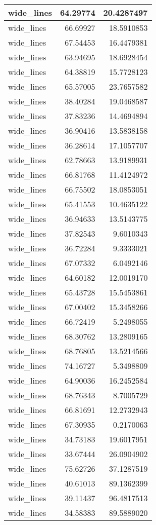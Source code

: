\documentclass[
]{book}
\theoremstyle{definition}
\theoremstyle{definition}
\theoremstyle{definition}
\theoremstyle{definition}
\theoremstyle{remark}
\begin{document}
\begin{tabular}{l|r|r}
\hline
wide\_lines & 64.29774 & 20.4287497\\
\hline
wide\_lines & 66.69927 & 18.5910853\\
\hline
wide\_lines & 67.54453 & 16.4479381\\
\hline
wide\_lines & 63.94695 & 18.6928454\\
\hline
wide\_lines & 64.38819 & 15.7728123\\
\hline
wide\_lines & 65.57005 & 23.7657582\\
\hline
wide\_lines & 38.40284 & 19.0468587\\
\hline
wide\_lines & 37.83236 & 14.4694894\\
\hline
wide\_lines & 36.90416 & 13.5838158\\
\hline
wide\_lines & 36.28614 & 17.1057707\\
\hline
wide\_lines & 62.78663 & 13.9189931\\
\hline
wide\_lines & 66.81768 & 11.4124972\\
\hline
wide\_lines & 66.75502 & 18.0853051\\
\hline
wide\_lines & 65.41553 & 10.4635122\\
\hline
wide\_lines & 36.94633 & 13.5143775\\
\hline
wide\_lines & 37.82543 & 9.6010343\\
\hline
wide\_lines & 36.72284 & 9.3333021\\
\hline
wide\_lines & 67.07332 & 6.0492146\\
\hline
wide\_lines & 64.60182 & 12.0019170\\
\hline
wide\_lines & 65.43728 & 15.5453861\\
\hline
wide\_lines & 67.00402 & 15.3458266\\
\hline
wide\_lines & 66.72419 & 5.2498055\\
\hline
wide\_lines & 68.30762 & 13.2809165\\
\hline
wide\_lines & 68.76805 & 13.5214566\\
\hline
wide\_lines & 74.16727 & 5.3498809\\
\hline
wide\_lines & 64.90036 & 16.2452584\\
\hline
wide\_lines & 68.76343 & 8.7005729\\
\hline
wide\_lines & 66.81691 & 12.2732943\\
\hline
wide\_lines & 67.30935 & 0.2170063\\
\hline
wide\_lines & 34.73183 & 19.6017951\\
\hline
wide\_lines & 33.67444 & 26.0904902\\
\hline
wide\_lines & 75.62726 & 37.1287519\\
\hline
wide\_lines & 40.61013 & 89.1362399\\
\hline
wide\_lines & 39.11437 & 96.4817513\\
\hline
wide\_lines & 34.58383 & 89.5889020\\
\hline
\end{tabular}
\end{document}
